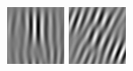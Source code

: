 \begin{figure}
\begin{center}
  \includegraphics[width=\columnwidth/9]{ch4/figures/imag_2_0.jpg}
  \includegraphics[width=\columnwidth/9]{ch4/figures/imag_2_1.jpg}

\end{center}
\end{figure}
